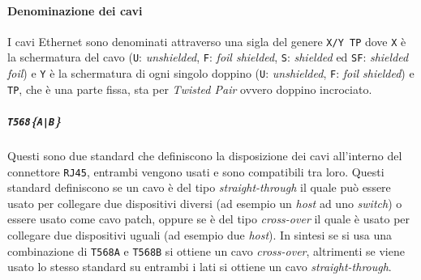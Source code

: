            \paragraph{Denominazione dei cavi} I cavi Ethernet sono denominati attraverso una sigla del genere \texttt{X/Y TP} dove \texttt{X} è la schermatura del cavo (\texttt{U}: \textit{unshielded}, \texttt{F}: \textit{foil shielded}, \texttt{S}: \textit{shielded} ed \texttt{SF}: \textit{shielded foil}) e \texttt{Y} è la schermatura di ogni singolo doppino (\texttt{U}: \textit{unshielded}, \texttt{F}: \textit{foil shielded}) e \texttt{TP}, che è una parte fissa, sta per \textit{Twisted Pair} ovvero doppino incrociato.
            \subparagraph{\texttt{T568}\{\texttt{A|B}\}} Questi sono due standard che definiscono la disposizione dei cavi all'interno del connettore \texttt{RJ45}, entrambi vengono usati e sono compatibili tra loro. Questi standard definiscono se un cavo è del tipo \textit{straight-through} il quale può essere usato per collegare due dispositivi diversi (ad esempio un \textit{host} ad uno \textit{switch}) o essere usato come cavo patch, oppure se è del tipo \textit{cross-over} il quale è usato per collegare due dispositivi uguali (ad esempio due \textit{host}). In sintesi se si usa una combinazione di \texttt{T568A} e \texttt{T568B} si ottiene un cavo \textit{cross-over}, altrimenti se viene usato lo stesso standard su entrambi i lati si ottiene un cavo \textit{straight-through}. 
